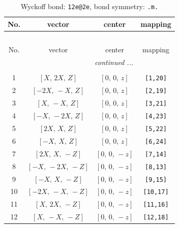 \documentclass[fleqn,8pt]{jsarticle}
\begin{document}
\begin{longtable}{cccc}
\caption{Wyckoff bond: {\tt 12e@2e}, bond symmetry: {\tt .m.}}
 \\
 \hline \hline
No. & vector & center & mapping \\ \hline \endfirsthead

\multicolumn{3}{l}{\tablename\ \thetable{}} \\
 \hline \hline
No. & vector & center & mapping \\ \hline \endhead

 \hline \hline
\multicolumn{3}{r}{\footnotesize\it continued ...} \\ \endfoot

 \hline \hline
\multicolumn{3}{r}{} \\ \endlastfoot

1 & $\left[ X,\, 2 X,\, Z \right]$ & $\left[ 0,\, 0,\, z \right]$ & {\tt [1,20]} \\ \hline
2 & $\left[ - 2 X,\, - X,\, Z \right]$ & $\left[ 0,\, 0,\, z \right]$ & {\tt [2,19]} \\ \hline
3 & $\left[ X,\, - X,\, Z \right]$ & $\left[ 0,\, 0,\, z \right]$ & {\tt [3,21]} \\ \hline
4 & $\left[ - X,\, - 2 X,\, Z \right]$ & $\left[ 0,\, 0,\, z \right]$ & {\tt [4,23]} \\ \hline
5 & $\left[ 2 X,\, X,\, Z \right]$ & $\left[ 0,\, 0,\, z \right]$ & {\tt [5,22]} \\ \hline
6 & $\left[ - X,\, X,\, Z \right]$ & $\left[ 0,\, 0,\, z \right]$ & {\tt [6,24]} \\ \hline
7 & $\left[ 2 X,\, X,\, - Z \right]$ & $\left[ 0,\, 0,\, - z \right]$ & {\tt [7,14]} \\ \hline
8 & $\left[ - X,\, - 2 X,\, - Z \right]$ & $\left[ 0,\, 0,\, - z \right]$ & {\tt [8,13]} \\ \hline
9 & $\left[ - X,\, X,\, - Z \right]$ & $\left[ 0,\, 0,\, - z \right]$ & {\tt [9,15]} \\ \hline
10 & $\left[ - 2 X,\, - X,\, - Z \right]$ & $\left[ 0,\, 0,\, - z \right]$ & {\tt [10,17]} \\ \hline
11 & $\left[ X,\, 2 X,\, - Z \right]$ & $\left[ 0,\, 0,\, - z \right]$ & {\tt [11,16]} \\ \hline
12 & $\left[ X,\, - X,\, - Z \right]$ & $\left[ 0,\, 0,\, - z \right]$ & {\tt [12,18]} \\
\end{longtable}
\renewcommand{\arraystretch}{1.2}
\end{document}
